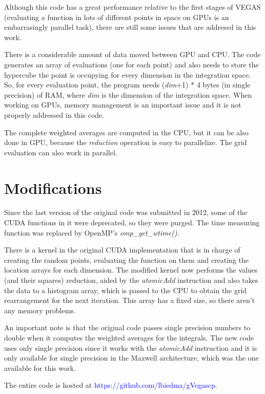 \documentclass[english]{maciarticle}
\begin{document}
Although this code has a great performance relative to the first stages of VEGAS (evaluating a function in lots of different points in space on GPUs is an embarrasingly parallel task), there are still some issues that are addresed in this work.

There is a considerable amount of data moved between GPU and CPU. The code generates an array of evaluations (one for each point) and also needs to store the hypercube the point is occupying for every dimension in the integration space. So, for every evaluation point, the program needs (\textit{dim}+1) * 4 bytes (in single precision) of RAM, where \textit{dim} is the dimension of the integration space. When working on GPUs, memory management is an important issue and it is not properly addressed in this code.

The complete weighted averages are computed in the CPU, but it can be also done in GPU, because the \textit{reduction} operation is easy to parallelize. The grid evaluation can also work in parallel.

\section{Modifications}

Since the last version of the original code was submitted in 2012, some of the CUDA functions in it were deprecated, so they were purged. The time measuring function was replaced by OpenMP's \textit{omp\_get\_wtime()}.

There is a kernel in the original CUDA implementation that is in charge of creating the random points, evaluating the function on them and creating the location arrays for each dimension. The modified kernel now performs the values (and their squares) reduction, aided by the \textit{atomicAdd} instruction\cite{cudaprog} and also takes the data to a histogram array, which is passed to the CPU to obtain the grid rearrangement for the next iteration. This array has a fixed size, so there aren't any memory problems.

An important note is that the original code passes single precision numbers to double when it computes the weighted averages for the integrals. The new code uses only single precision since it works with the \textit{atomicAdd} instruction and it is only available for single precision in the Maxwell architecture, which was the one available for this work.

The entire code is hosted at \textcolor{blue}{https://github.com/lbiedma/gVegascp}.
\end{document}
